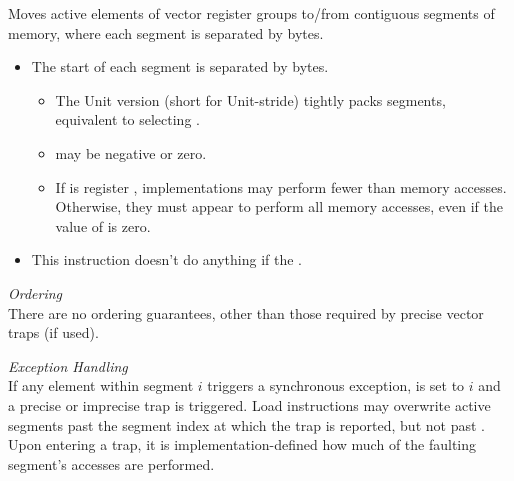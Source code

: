 \noindent
Moves active elements of  vector register groups to/from contiguous segments of memory,
where each segment is separated by  bytes.

\begin{itemize}
    \item The start of each segment is separated by  bytes.
    \begin{itemize}
        \item The Unit version (short for Unit-stride) tightly packs segments, equivalent to selecting .
        \item {} may be negative or zero.
        \item If  is register , implementations may perform fewer than  memory accesses. Otherwise, they must appear to perform all memory accesses, even if the value of  is zero.
    \end{itemize}
    \item This instruction doesn't do anything if the .
\end{itemize}


\noindent
\emph{Ordering}
\\\noindent
There are no ordering guarantees, other than those required by precise vector traps (if used).



\noindent
\emph{Exception Handling}
\\\noindent
If any element within segment $i$ triggers a synchronous exception,  is set to $i$ and a precise or imprecise trap is triggered.
Load instructions may overwrite active segments past the segment index at which the trap is reported, but not past .\cite[Section 7.7]{RISCVVectorExtension2021}
Upon entering a trap, it is implementation-defined how much of the faulting segment's accesses are performed.


